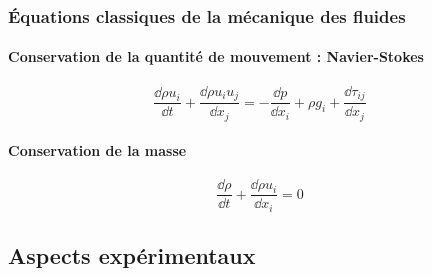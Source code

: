 \subsubsection{Équations classiques de la mécanique des fluides}
\vspace{0.3cm}\paragraph{Conservation de la quantité de mouvement : Navier-Stokes}
\begin{equation}
	\frac{\dd \rho u_i}{\dd t} + \frac{\dd \rho u_i u_j}{\dd x_j} = -\frac{\dd p}{\dd x_i} + \rho g_i + \frac{\dd \tau_{ij}}{\dd x_j}
\end{equation}
\paragraph{Conservation de la masse}
\begin{equation}
 \frac{\dd \rho}{\dd t} + \frac{\dd \rho u_{i}}{\dd x_i} = 0
\end{equation}












\subsection{Aspects expérimentaux}

